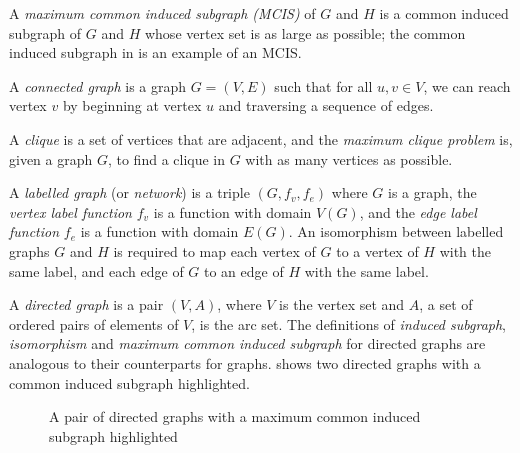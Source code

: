 A \emph{maximum common induced subgraph (MCIS)} of $G$ and $H$ is a common
induced subgraph of $G$ and $H$ whose vertex set is as large as possible; the
common induced subgraph in  is an example of an MCIS.

A \emph{connected graph} is a graph $G=(V,E)$ such that for all $u,v \in V$,
we can reach vertex $v$ by beginning at vertex $u$ and traversing a sequence
of edges.

A \emph{clique} is a set of vertices that are   adjacent, and the
\emph{maximum clique problem} is, given a graph $G$, to find a clique in $G$
with as many vertices as possible.

A \emph{labelled graph} (or \emph{network}) is a triple $(G, f_v, f_e)$
where $G$ is a graph,
the \emph{vertex label function} $f_v$ is a function with domain $V(G)$,
and the \emph{edge label function} $f_e$ is a function with domain $E(G)$.
An isomorphism between labelled graphs $G$ and $H$ is required to map each vertex of
$G$ to a vertex of $H$ with the same label,
and each edge of $G$ to an edge of $H$ with the same label.

A \emph{directed graph} is a pair $(V,A)$, where $V$ is the vertex set and $A$,
a set of ordered pairs of elements of $V$, is the arc set.  The definitions of
\emph{induced subgraph}, \emph{isomorphism} and \emph{maximum common induced
subgraph} for directed graphs are analogous to their counterparts for graphs.
 shows two directed graphs with a common
induced subgraph highlighted.

\begin{figure}[h!]
\centering
{}
\qquad
{}
\caption{A pair of directed graphs with a maximum common induced subgraph highlighted}
\label{fig:directed-cis-example}
\end{figure}

